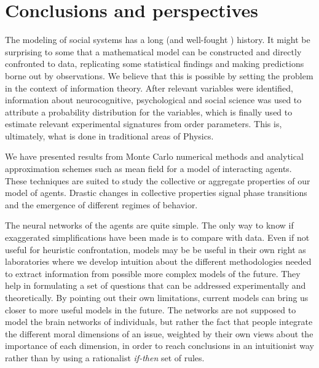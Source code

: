 \documentclass[twocolumn,showpacs]{revtex4-1}
\begin{document}
\section{\label{sec:conclusions} Conclusions and perspectives}
The modeling of social systems has a long (and well-fought \cite{GalamBook}) history. It might 
be surprising to some that a mathematical model can be constructed
and  directly confronted to data, replicating some statistical findings and 
making predictions borne out by observations. We believe that this is possible
by setting the problem in the context of information theory. 
After relevant variables were identified, information about
neurocognitive, psychological and social science was used 
to attribute a probability distribution for the variables, 
which is finally used to estimate relevant
experimental signatures from order parameters. 
This is, ultimately, what is done in traditional areas of Physics. 


We have presented results from Monte Carlo numerical methods 
and analytical approximation schemes such 
as mean field for a model of interacting agents. 
These techniques are suited to study the collective or aggregate
properties of our model of agents.  Drastic changes in collective properties
signal phase transitions and the emergence of different
regimes of behavior. 

The neural networks of the agents are  quite simple. 
The only way to know if exaggerated simplifications
have been made is to compare with data. Even if not useful for
heuristic confrontation, models may be be useful in their own right as
laboratories where we develop intuition about the different
methodologies needed to extract information from possible more complex
models of the future. They help in formulating a set of questions that can be
addressed experimentally and theoretically. By pointing out their own
limitations,  current models can bring us closer to more useful models in
the future. The networks are not supposed to model the 
brain networks of individuals, but rather the fact that 
people integrate the different moral dimensions of an issue, weighted
by their own views about the importance of each dimension, in order
to reach conclusions in an intuitionist way rather than by using
a rationalist {\it  if-then}  set of rules. 
 
\end{document}

